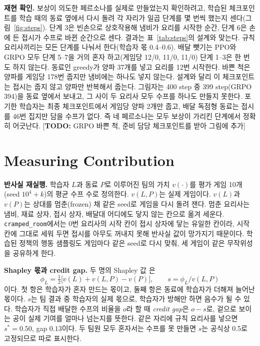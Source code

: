 \documentclass[letterpaper]{article} %
\newcommand{\TODO}[1]{[\textbf{TODO:} #1]}
\begin{document}
\textbf{재현 확인.} 보상이 의도한 페르소나를 실제로 만들었는지 확인하려고, 학습된 체크포인트를 학습 때의
동료 옆에서 다시 돌려 각 자리가 일곱 단계를 몇 번씩 했는지 센다(그림~\ref{fig:steps}). 단계 3은 빈손으로
상호작용해 냄비가 요리를 시작한 순간, 단계 6은 손에 든 접시가 수프로 바뀐 순간으로 센다. 결과는
표~\ref{tab:steps}의 설계와 맞는다. 규칙 요리사끼리는 모든 단계를 나눠서 한다(학습자 몫 0.4--0.6).
배달 뺏기는 PPO와 GRPO 모두 단계 5--7을 거의 혼자 하고(게임당 12/0, 11/0, 11/0) 단계 1--3은 한 번도 하지
않는다. 동료인 greedy가 양파 37개를 넣고 요리를 12번 시작한다. 바쁜 척은 양파를 게임당 178번 줍지만
냄비에는 하나도 넣지 않는다. 설계와 달리 이 체크포인트는 접시는 줍지 않고 양파만 반복해서 줍는다.
그림자는 400 step 중 399 step(GRPO 394)을 동료 옆에서 보내고, 그 사이 두 요리사 모두 수프를 하나도 만들지
못한다. 포기한 학습자는 최종 체크포인트에서 게임당 양파 2개만 줍고, 배달 독점형 동료는 접시를 46번 집지만
담을 수프가 없다. 즉 네 페르소나는 모두 보상이 가리킨 단계에서 정확히 어긋난다.
\TODO{GRPO 바쁜 척, 준비 담당 체크포인트를 받아 그림에 추가}

\section{Measuring Contribution}
\textbf{반사실 재실행.} 학습자 $L$과 동료 $P$로 이루어진 팀의 가치 $v(\cdot)$를 평가 게임 10개(seed
$10^4+k$)의 평균 수프 수로 정의한다. $v(L,P)$는 실제 게임이다. $v(L)$과 $v(P)$는 상대를 멈춘(frozen) 채
같은 seed로 게임을 다시 돌려 잰다. 멈춘 요리사는 냄비, 재료 상자, 접시 상자, 배달대 어디에도 닿지 않는
칸으로 옮겨 세운다. \texttt{cramped\_room}에서는 0번 요리사의 시작 칸이 접시 상자에 닿는 유일한 칸이라,
시작 칸에 그대로 세워 두면 접시를 아무도 꺼내지 못해 반사실 값이 망가지기 때문이다. 학습된 정책의 행동
샘플링도 게임마다 같은 seed로 다시 맞춰, 세 게임이 같은 무작위성을 공유하게 한다.

\textbf{Shapley 몫과 credit gap.} 두 명의 Shapley 값 \cite{shapley1953value}은
\begin{equation}
\phi_L = \tfrac{1}{2}\bigl[v(L) + v(L,P) - v(P)\bigr],\qquad s = \phi_L / v(L,P)
\end{equation}
이다. 첫 항은 학습자가 혼자 만드는 몫이고, 둘째 항은 동료에 학습자가 더해져 늘어난 몫이다. $s$는 팀 결과
중 학습자의 실제 몫으로, 학습자가 방해만 하면 음수가 될 수 있다. 학습자가 직접 배달한 수프의 비율을 $o$라
할 때 \emph{credit gap}은 $o - s$로, 겉으로 보이는 공이 실제 기여를 얼마나 넘는지를 뜻한다. 같은 자리에
규칙 요리사를 넣으면 $s^*=0.50$, gap $0.13$이다. 두 팀원 모두 혼자서는 수프를 못 만들면 $s$는 공식상
0.5로 고정되므로 따로 표시한다.
\end{document}
